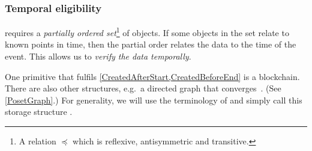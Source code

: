
\subsubsection{Temporal eligibility}

 requires a \emph{partially ordered 
  set}\footnote{%
  A relation \(\preceq\) which is reflexive, antisymmetric and transitive.
} of objects.
If some objects in the set relate to known points in time, then the partial 
order relates the data to the time of the event.
This allows us to \emph{verify the data temporally}.

One primitive that fulfils \cref{CreatedAfterStart,CreatedBeforeEnd} is a 
blockchain.
There are also other structures, e.g.\ a directed graph that 
converges~\cite{BlockchainFreeCryptocurrencies}.
(See \cref{PosetGraph}.)
For generality, we will use the terminology of 
\textcite{BlockchainFreeCryptocurrencies} and simply call this storage 
structure .

